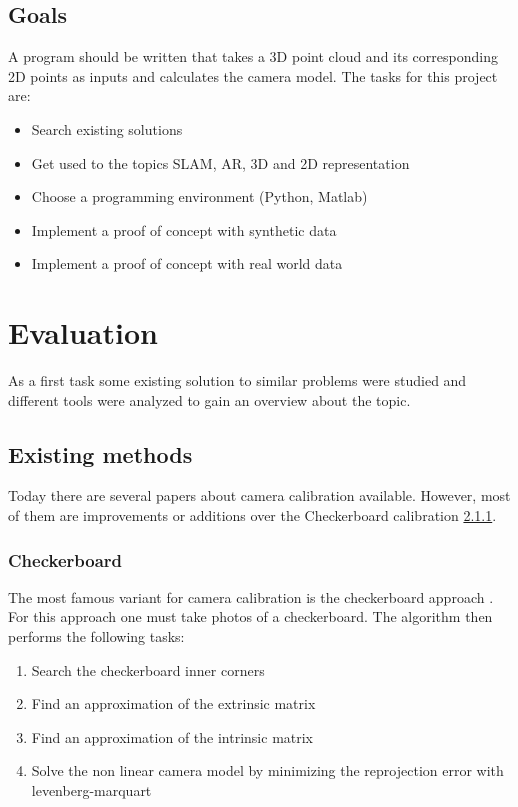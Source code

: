 \documentclass[11pt,a4paper,titlepage,oneside]{report}
\begin{document}
\section{Goals}
A program should be written that takes a 3D point cloud and its corresponding 2D points as inputs and calculates the camera model. The tasks for this project are:
\begin{itemize}
\item Search existing solutions
\item Get used to the topics SLAM, AR, 3D and 2D representation
\item Choose a programming environment (Python, Matlab)
\item Implement a proof of concept with synthetic data
\item Implement a proof of concept with real world data
\end{itemize}

\chapter{Evaluation}

As a first task some existing solution to similar problems were studied and different tools were analyzed to gain an overview about the topic.

\section{Existing methods}

Today there are several papers about camera calibration available. However, most of them are improvements or additions over the Checkerboard calibration \ref{sec:checkerboard}.

\subsection{Checkerboard}\label{sec:checkerboard}
The most famous variant for camera calibration is the checkerboard approach \cite{Zhang}. For this approach one must take photos of a checkerboard. The algorithm then performs the following tasks:
\begin{enumerate}
  \item Search the checkerboard inner corners
  \item Find an approximation of the extrinsic matrix
  \item Find an approximation of the intrinsic matrix
  \item Solve the non linear camera model by minimizing the reprojection error with levenberg-marquart
\end{enumerate}
\end{document}
